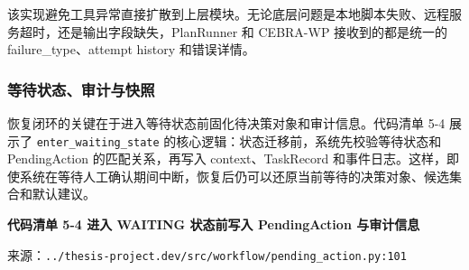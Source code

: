 \begin{Shaded}
\begin{Highlighting}[]
\OperatorTok{=} 
        \OperatorTok{\textgreater{}} \NormalTok{:}
            \OperatorTok{/} \NormalTok{)}

     \NormalTok{)}
\end{Highlighting}
\end{Shaded}

该实现避免工具异常直接扩散到上层模块。无论底层问题是本地脚本失败、远程服务超时，还是输出字段缺失，PlanRunner
和 CEBRA-WP 接收到的都是统一的 failure\_type、attempt history
和错误详情。

\subsubsection{等待状态、审计与快照}\label{ux7b49ux5f85ux72b6ux6001ux5ba1ux8ba1ux4e0eux5febux7167}

恢复闭环的关键在于进入等待状态前固化待决策对象和审计信息。代码清单 5-4
展示了 \texttt{enter\_waiting\_state}
的核心逻辑：状态迁移前，系统先校验等待状态和 PendingAction
的匹配关系，再写入 context、TaskRecord
和事件日志。这样，即使系统在等待人工确认期间中断，恢复后仍可以还原当前等待的决策对象、候选集合和默认建议。

\textbf{代码清单 5-4 进入 WAITING 状态前写入 PendingAction 与审计信息}

来源：\texttt{../thesis-project.dev/src/workflow/pending\_action.py:101}

